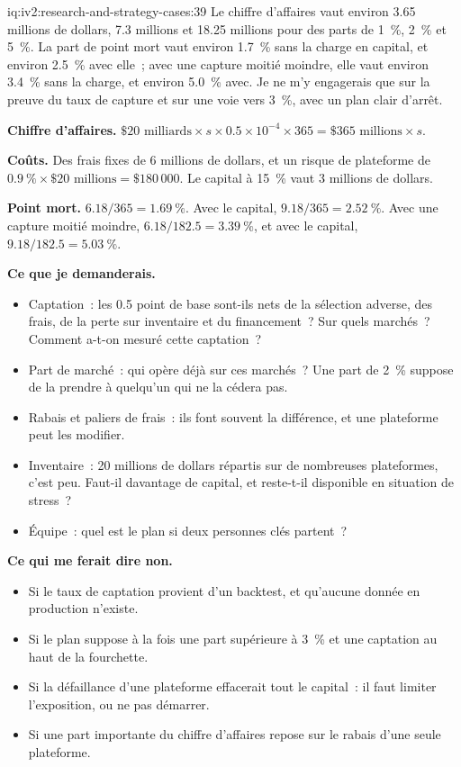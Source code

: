 \begin{solution}{iq:iv2:research-and-strategy-cases:39}
Le chiffre d'affaires vaut environ 3.65 millions de dollars, 7.3 millions et 18.25 millions pour des parts de 1~\%, 2~\% et 5~\%. La part de point mort vaut environ 1.7~\% sans la charge en capital, et environ 2.5~\% avec elle~; avec une capture moitié moindre, elle vaut environ 3.4~\% sans la charge, et environ 5.0~\% avec. Je ne m'y engagerais que sur la preuve du taux de capture et sur une voie vers 3~\%, avec un plan clair d'arrêt.

\textbf{Chiffre d'affaires.} $\$20 \text{ milliards} \times s \times 0.5 \times 10^{-4} \times 365 = \$365 \text{ millions} \times s$.

\textbf{Coûts.} Des frais fixes de 6 millions de dollars, et un risque de plateforme de $0.9~\% \times \$20 \text{ millions} = \$180\,000$. Le capital à 15~\% vaut 3 millions de dollars.

\textbf{Point mort.} $6.18/365 = 1.69~\%$. Avec le capital, $9.18/365 = 2.52~\%$. Avec une capture moitié moindre, $6.18/182.5 = 3.39~\%$, et avec le capital, $9.18/182.5 = 5.03~\%$.

\textbf{Ce que je demanderais.}
\begin{itemize}
\item Captation~: les 0.5 point de base sont-ils nets de la sélection adverse, des frais, de la perte sur inventaire et du financement~? Sur quels marchés~? Comment a-t-on mesuré cette captation~?
\item Part de marché~: qui opère déjà sur ces marchés~? Une part de 2~\% suppose de la prendre à quelqu'un qui ne la cédera pas.
\item Rabais et paliers de frais~: ils font souvent la différence, et une plateforme peut les modifier.
\item Inventaire~: 20 millions de dollars répartis sur de nombreuses plateformes, c'est peu. Faut-il davantage de capital, et reste-t-il disponible en situation de stress~?
\item Équipe~: quel est le plan si deux personnes clés partent~?
\end{itemize}

\textbf{Ce qui me ferait dire non.}
\begin{itemize}
\item Si le taux de captation provient d'un backtest, et qu'aucune donnée en production n'existe.
\item Si le plan suppose à la fois une part supérieure à 3~\% et une captation au haut de la fourchette.
\item Si la défaillance d'une plateforme effacerait tout le capital~: il faut limiter l'exposition, ou ne pas démarrer.
\item Si une part importante du chiffre d'affaires repose sur le rabais d'une seule plateforme.
\end{itemize}


\end{solution}

